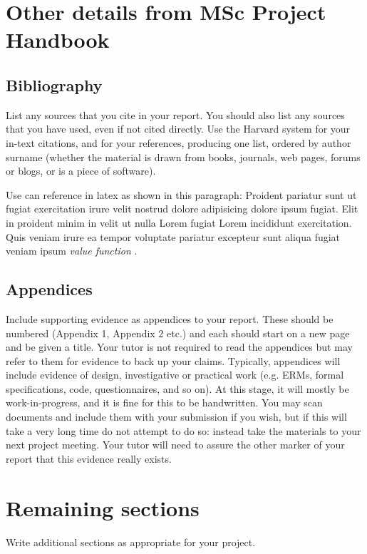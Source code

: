 \documentclass[a4paper, notitlepage, 11pt]{article}
\begin{document}
\section{Other details from MSc Project Handbook}

\subsection{Bibliography}

List any sources that you cite in your report. You should also list any sources that you have used, even if not cited directly. Use the Harvard system for your in-text citations, and for your references, producing one list, ordered by author surname (whether the material is drawn from books, journals, web pages, forums or blogs, or is a piece of software).

Use can reference in latex as shown in this paragraph: Proident pariatur sunt ut fugiat exercitation irure velit nostrud dolore adipisicing dolore ipsum fugiat. Elit in proident minim in velit ut nulla Lorem fugiat Lorem incididunt exercitation. Quis veniam irure ea tempor voluptate pariatur excepteur sunt aliqua fugiat veniam ipsum \emph{value function}  \citep{Sutton2018}.  


\subsection{Appendices}

Include supporting evidence as appendices to your report. These should be numbered (Appendix 1, Appendix 2 etc.) and each should start on a new page and be given a title. Your tutor is not required to read the appendices but may refer to them for evidence to back up your claims. Typically, appendices will include evidence of design, investigative or practical work (e.g. ERMs, formal specifications, code, questionnaires, and so on). At this stage, it will mostly be work-in-progress, and it is fine for this to be handwritten. You may scan documents and include them with your submission if you wish, but if this will take a very long time do not attempt to do so: instead take the materials to your next project meeting. Your tutor will need to assure the other marker of your report that this evidence really exists.

\section{Remaining sections}
Write additional sections as appropriate for your project.







\clearpage
\appendix 
{}

\end{document}
